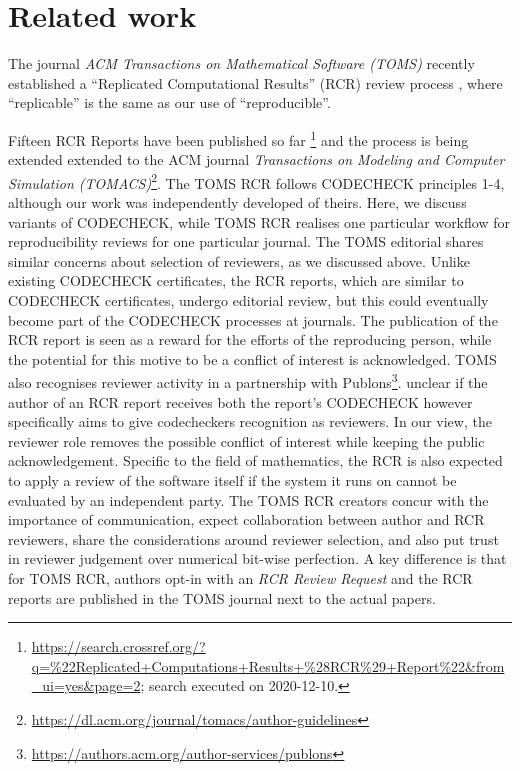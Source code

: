 \documentclass[12pt]{article}
\begin{document}
\section*{Related work}\label{related-work}

The journal \emph{ACM Transactions on Mathematical Software (TOMS)} 
recently established a ``Replicated Computational Results'' (RCR) review process
\cite{heroux_editorial_2015}, where ``replicable'' is the same as our
use of ``reproducible''.  

Fifteen RCR Reports have been published so far
\footnote{\url{https://search.crossref.org/?q=\%22Replicated+Computations+Results+\%28RCR\%29+Report\%22&from_ui=yes&page=2};
  search executed on 2020-12-10.}
and the process is being extended extended to the ACM journal
\emph{Transactions on Modeling and Computer Simulation
  (TOMACS)}\footnote{\url{https://dl.acm.org/journal/tomacs/author-guidelines}}.
The TOMS RCR follows CODECHECK principles 1-4, although our work was
independently developed of theirs.  Here, we discuss variants of
CODECHECK, while TOMS RCR realises one particular workflow for
reproducibility reviews for one particular journal. The TOMS editorial
\cite{heroux_editorial_2015} shares similar concerns about selection
of reviewers, as we discussed above. Unlike existing CODECHECK
certificates, the RCR reports, which are similar to CODECHECK
certificates, undergo editorial review, but this could eventually
become part of the CODECHECK processes at journals.  The publication
of the RCR report is seen as a reward for the efforts of the
reproducing person, while the potential for this motive to be a
conflict of interest is acknowledged.  TOMS also recognises reviewer
activity in a partnership with Publons\footnote{
  \url{https://authors.acm.org/author-services/publons}}.
unclear if the author of an RCR report receives both the report's
CODECHECK however specifically aims to give codecheckers
recognition as reviewers.  In our view, the reviewer role removes the
possible conflict of interest while keeping the public
acknowledgement.  Specific to the field of mathematics, the RCR is
also expected to apply a review of the software itself if the system
it runs on cannot be evaluated by an independent party.  The TOMS RCR
creators concur with the importance of communication, expect
collaboration between author and RCR reviewers, share the
considerations around reviewer selection, and also put trust in
reviewer judgement over numerical bit-wise perfection.  A key
difference is that for TOMS RCR, authors opt-in with an \emph{RCR
  Review Request} and the RCR reports are published in the TOMS
journal next to the actual papers.
\end{document}

